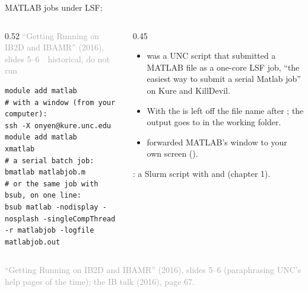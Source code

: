 \documentclass[aspectratio=169,11pt]{beamer}
\newcommand{\sourcecredit}[1]{\vfill\begin{flushright}\tiny\textcolor{DarkGray}{#1}\end{flushright}}
\newcommand{\hist}[1]{{\tiny\sffamily\textcolor{DarkGray}{#1\ \textbullet\ historical, do not run}}\par\nointerlineskip\vspace{0.3mm}}
\begin{document}
\begin{frame}[fragile]{MATLAB jobs under LSF: }
\label{fr:bmatlab}
\begin{columns}[T,onlytextwidth]
\begin{column}{0.52\textwidth}
\hist{``Getting Running on IB2D and IBAMR'' (2016), slides 5--6}
\begin{lstlisting}[style=hist]
module add matlab
# with a window (from your computer):
ssh -X onyen@kure.unc.edu
module add matlab
xmatlab
# a serial batch job:
bmatlab matlabjob.m
# or the same job with bsub, on one line:
bsub matlab -nodisplay -nosplash -singleCompThread -r matlabjob -logfile matlabjob.out
\end{lstlisting}
\end{column}
\begin{column}{0.45\textwidth}
\footnotesize
\begin{itemize}\setlength{\itemsep}{2pt}
  \item {} was a UNC script that submitted a MATLAB file as a one-core LSF job, ``the easiest way to submit a serial Matlab job'' on Kure and KillDevil.
  \item With  the  is left off the file name after ; the output goes to  in the working folder.
  \item {} forwarded MATLAB's window to your own screen ().
\end{itemize}
\vspace{1mm}
: a Slurm script with  and  (chapter 1).
\end{column}
\end{columns}
\sourcecredit{``Getting Running on IB2D and IBAMR'' (2016), slides 5--6 (paraphrasing UNC's help pages of the time); the IB talk (2016), page 67.}
\end{frame}
\end{document}
